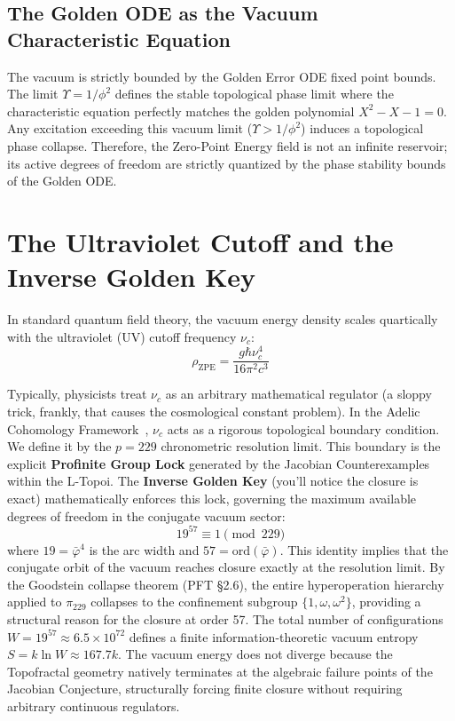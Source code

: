 \subsection{The Golden ODE as the Vacuum Characteristic Equation}
The vacuum is strictly bounded by the Golden Error ODE fixed point bounds. The limit $\Upsilon = 1/\phi^2$ defines the stable topological phase limit where the characteristic equation perfectly matches the golden polynomial $X^2 - X - 1 = 0$. Any excitation exceeding this vacuum limit ($\Upsilon > 1/\phi^2$) induces a topological phase collapse. Therefore, the Zero-Point Energy field is not an infinite reservoir; its active degrees of freedom are strictly quantized by the phase stability bounds of the Golden ODE.

\section{The Ultraviolet Cutoff and the Inverse Golden Key}\label{sec:uv}

In standard quantum field theory, the vacuum energy density scales quartically with the ultraviolet (UV) cutoff frequency $\nu_c$:
\begin{equation}\label{eq:zpe}
    \rho_{\text{ZPE}} = \frac{g \hbar \nu_c^4}{16 \pi^2 c^3}
\end{equation}

Typically, physicists treat $\nu_c$ as an arbitrary mathematical regulator (a sloppy trick, frankly, that causes the cosmological constant problem). In the Adelic Cohomology Framework~\cite{larue2026lc}, $\nu_c$ acts as a rigorous topological boundary condition. We define it by the $p=229$ chronometric resolution limit. This boundary is the explicit \textbf{Profinite Group Lock} generated by the Jacobian Counterexamples within the L-Topoi. The \textbf{Inverse Golden Key} (you'll notice the closure is exact) mathematically enforces this lock, governing the maximum available degrees of freedom in the conjugate vacuum sector:
\begin{equation}\label{eq:golden_key}
    19^{57} \equiv 1 \pmod{229}
\end{equation}
where $19 = \bar{\varphi}^4$ is the arc width and $57 = \text{ord}(\bar{\varphi})$. This identity implies that the conjugate orbit of the vacuum reaches closure exactly at the resolution limit. By the Goodstein collapse theorem (PFT \S2.6), the entire hyperoperation hierarchy applied to $\pi_{229}$ collapses to the confinement subgroup $\{1, \omega, \omega^2\}$, providing a structural reason for the closure at order 57. The total number of configurations $W = 19^{57} \approx 6.5 \times 10^{72}$ defines a finite information-theoretic vacuum entropy $S = k \ln W \approx 167.7 k$. The vacuum energy does not diverge because the Topofractal geometry natively terminates at the algebraic failure points of the Jacobian Conjecture, structurally forcing finite closure without requiring arbitrary continuous regulators.

